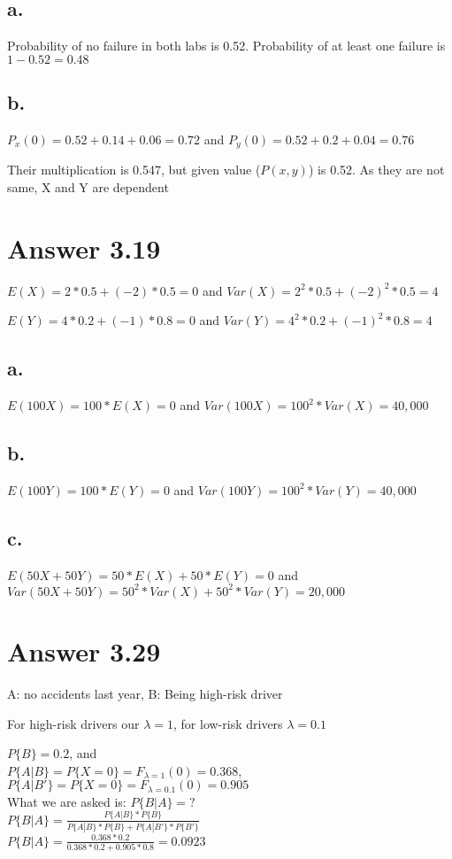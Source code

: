\documentclass[12pt]{article}
\begin{document}
\subsection*{a.}

Probability of no failure in both labs is 0.52. Probability of at least one failure is $1-0.52 = 0.48$

\subsection*{b.}

$P_x(0) = 0.52+0.14+0.06 = 0.72$ and $P_y(0) = 0.52 + 0.2 + 0.04 = 0.76$\ 

Their multiplication is 0.547, but given value ($P(x,y)$) is 0.52. As they are not same, X and Y are dependent

\section*{Answer 3.19}

$E(X) = 2 * 0.5 + (-2)*0.5 = 0$ and $Var(X) = 2^2*0.5+(-2)^2*0.5 = 4$\ 

\noindent $E(Y) = 4*0.2 +(-1)*0.8 = 0$ and $Var(Y) = 4^2*0.2 + (-1)^2*0.8 = 4$

\subsection*{a.}

$E(100X) = 100*E(X) = 0$ and $Var(100X) = 100^2*Var(X) = 40,000$

\subsection*{b.}

$E(100Y) = 100*E(Y) = 0$ and $Var(100Y) = 100^2*Var(Y) = 40,000$

\subsection*{c.}

$E(50X + 50Y) = 50*E(X) + 50*E(Y) = 0$ and $Var(50X+50Y) = 50^2*Var(X) + 50^2*Var(Y) = 20,000$

\section*{Answer 3.29}

A: no accidents last year, B: Being high-risk driver\ 

\noindent For high-risk drivers our $\lambda = 1$, for low-risk drivers $\lambda = 0.1$

\noindent $P\{B\} = 0.2$, and\\ $P\{A|B\} = P\{X=0\} = F_{\lambda = 1}(0) = 0.368$, $P\{A|B'\} = P\{X=0\} = F_{\lambda = 0.1}(0) = 0.905$\\

What we are asked is: $P\{B|A\} = ?$\\

$P\{B|A\} = \frac{P\{A|B\}*P\{B\}}{P\{A|B\}*P\{B\} + P\{A|B'\}*P\{B'\}}$\\

$P\{B|A\} = \frac{0.368*0.2}{0.368*0.2+0.905*0.8} = 0.0923$
\end{document}
